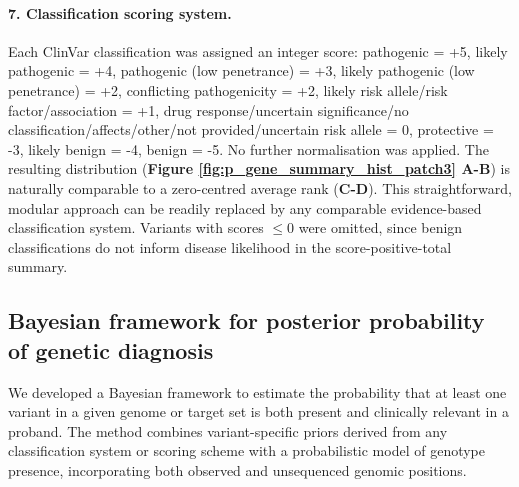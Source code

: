 \paragraph{7. Classification scoring system.}
\label{sec:classification_score}
Each ClinVar classification was assigned an integer score: pathogenic = +5, likely pathogenic = +4, pathogenic (low penetrance) = +3, likely pathogenic (low penetrance) = +2, conflicting pathogenicity = +2, likely risk allele/risk factor/association = +1, drug response/uncertain significance/no classification/affects/other/not provided/uncertain risk allele = 0, protective = -3, likely benign = -4, benign = -5. No further normalisation was applied. The resulting distribution (\textbf{Figure \ref{fig:p_gene_summary_hist_patch3} A-B}) is naturally comparable to a zero-centred average rank (\textbf{C-D}). This straightforward, modular approach can be readily replaced by any comparable evidence-based classification system. Variants with scores  $\leq 0$ were omitted, since benign classifications do not inform disease likelihood in the score-positive-total summary.


\subsection{Bayesian framework for posterior probability of genetic diagnosis}

We developed a Bayesian framework to estimate the probability that at least one variant in a given genome or target set is both present and clinically relevant in a proband. The method combines variant-specific priors derived from any classification system or scoring scheme with a probabilistic model of genotype presence, incorporating both observed and unsequenced genomic positions.

